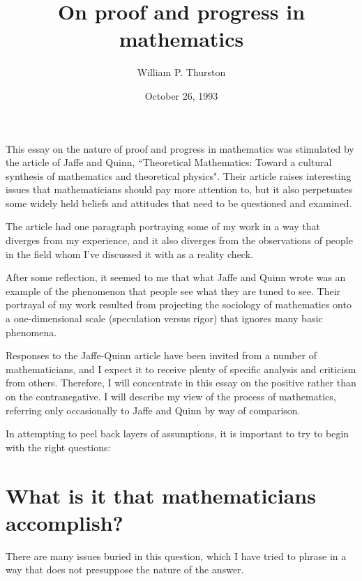 \documentclass[12pt]{amsart}
\begin{document}
\def\currentvolume{30}
\def\currentissue{2}
\def\currentyear{1994}
\def\currentmonth{April}
\def\copyrightyear{1994}
\def\currentpages{161-177}
\title{On proof and progress in mathematics}
\author{William P. Thurston}
\date{October 26, 1993}
\maketitle

This essay on the nature of proof and progress in 
mathematics was 
stimulated by the article of Jaffe and Quinn, 
``Theoretical Mathematics: 
Toward a cultural synthesis of mathematics and theoretical 
physics".
Their article raises interesting issues that 
mathematicians should pay more
attention to, but it also perpetuates some widely held
beliefs and attitudes that need to be questioned and 
examined.

The article had one paragraph portraying some of my work 
in a way
that diverges from my experience, and it also diverges 
from the observations
of people in the field whom I've discussed it with as a 
reality check.

After some reflection, it seemed to me that what Jaffe and 
Quinn
wrote was an example of the phenomenon that people see 
what they are
tuned to see. Their portrayal of my work resulted from
projecting the sociology of mathematics onto a 
one-dimensional
scale (speculation versus rigor) that ignores many basic 
phenomena.

Responses to the Jaffe-Quinn article have been invited 
from a number
of mathematicians, and I expect it to receive plenty of 
specific analysis
and criticism from others.  Therefore, I will concentrate 
in this essay
on the positive rather than on the contranegative.
I will describe my view of the process of mathematics, 
referring
only occasionally to Jaffe and Quinn by way of comparison.

\bigskip

In attempting to peel back layers of assumptions, it is 
important to
try to begin with the right questions:

\section{What is it that mathematicians accomplish?}

There are many issues buried in this question, which I 
have tried to phrase in
a way that does not presuppose the nature of the answer.
\end{document}
